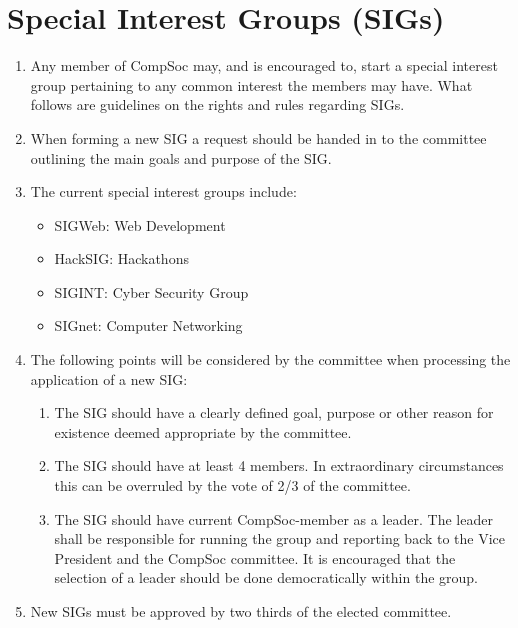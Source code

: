 \section{Special Interest Groups (SIGs)}

\begin{enumerate}

\item Any member of CompSoc may, and is encouraged to, start a special interest group pertaining to any common interest the members may have. What follows are guidelines on the rights and rules regarding SIGs.

\item When forming a new SIG a request should be handed in to the committee outlining the main goals and purpose of the SIG\@.

\item The current special interest groups include:
  \begin{itemize}
  \item SIGWeb: Web Development
  \item HackSIG\@: Hackathons
  \item SIGINT\@: Cyber Security Group
  \item SIGnet: Computer Networking
  \end{itemize}

\item The following points will be considered by the committee when processing the application of a new SIG\@:
  \begin{enumerate}
  \item The SIG should have a clearly defined goal, purpose or other reason for existence deemed appropriate by the committee.
  \item The SIG should have at least 4 members. In extraordinary circumstances this can be overruled by the vote of 2/3 of the committee.
  \item The SIG should have current CompSoc-member as a leader. The leader shall be responsible for running the group and reporting back to the Vice President and the CompSoc committee. It is encouraged that the selection of a leader should be done democratically within the group.
  \end{enumerate}

\item New SIGs must be approved by two thirds of the elected committee.


\end{enumerate}
